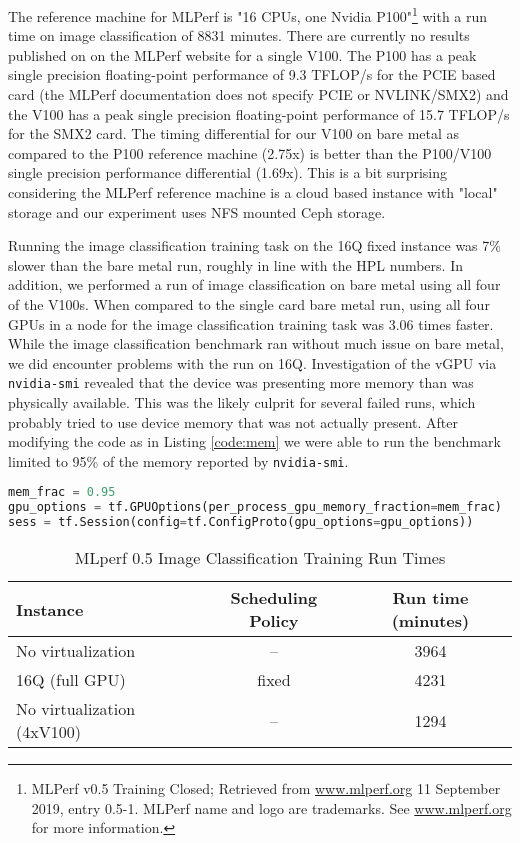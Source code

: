 \documentclass[conference]{IEEEtran}
\begin{document}
The reference machine for MLPerf is "16 CPUs, one Nvidia P100"\footnote{MLPerf v0.5 Training Closed; Retrieved from \url{www.mlperf.org} 11 September 2019, entry 0.5-1. MLPerf name and logo are trademarks. See \url{www.mlperf.org} for more information.} with a run time on image classification of 8831 minutes. There are currently no results published on on the MLPerf website for a single V100. The P100 has a peak single precision floating-point performance of 9.3 TFLOP/s for the PCIE based card (the MLPerf documentation does not specify PCIE or NVLINK/SMX2) and the V100 has a peak single precision floating-point performance of 15.7 TFLOP/s for the SMX2 card. The timing differential for our V100 on bare metal as compared to the P100 reference machine (2.75x) is better than the P100/V100 single precision performance differential (1.69x). This is a bit surprising considering the MLPerf reference machine is a cloud based instance with "local" storage and our experiment uses NFS mounted Ceph storage.  

Running the image classification training task on the 16Q fixed instance was 7\% slower than the bare metal run, roughly in line with the HPL numbers. In addition, we performed a run of image classification on bare metal using all four of the V100s. When compared to the single card bare metal run, using all four GPUs in a node for the image classification training task was 3.06 times faster. While the image classification benchmark ran without much issue on bare metal, we did encounter problems with the run on 16Q. Investigation of the vGPU via {\tt nvidia-smi} revealed that the device was presenting more memory than was physically available. This was the likely culprit for several failed runs, which probably tried to use device memory that was not actually present. After modifying the code as in Listing \ref{code:mem} we were able to run the benchmark limited to 95\% of the memory reported by {\tt nvidia-smi}. 

\begin{lstlisting}[language=Python, caption=Limiting memory usage in TensorFlow, label={code:mem}]
mem_frac = 0.95
gpu_options = tf.GPUOptions(per_process_gpu_memory_fraction=mem_frac)
sess = tf.Session(config=tf.ConfigProto(gpu_options=gpu_options))
 \end{lstlisting}
 
 \begin{table}[t]
\centering
\caption{MLperf 0.5 Image Classification Training Run Times}
\label{tab:mlperfimage}

\begin{tabular}{lcc}
\toprule
\textbf{Instance} & \textbf{Scheduling Policy} & \textbf{Run time (minutes)} \\
\midrule
No virtualization & -- & 3964\\
16Q (full GPU) & fixed & 4231\\
No virtualization (4xV100) & --  & 1294 \\

\bottomrule
\end{tabular}

\end{table}
\end{document}
